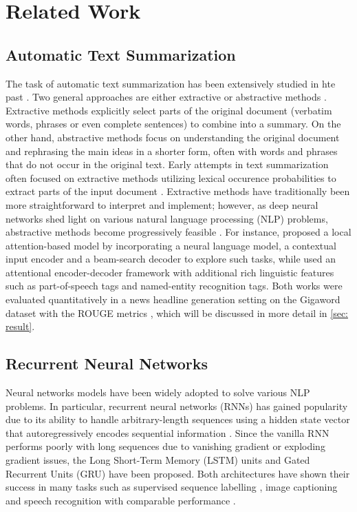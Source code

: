 \section{Related Work}
\label{sec: related_work}

\subsection{Automatic Text Summarization}

The task of automatic text summarization has been extensively studied in hte past \cite{gambhir2017recent}. Two general approaches are either extractive or abstractive methods \cite{gupta2010survey}. Extractive methods explicitly select parts of the original document (verbatim words, phrases or even complete sentences) to combine into a summary. On the other hand, abstractive methods focus on understanding the original document and rephrasing the main ideas in a shorter form, often with words and phrases that do not occur in the original text. Early attempts in text summarization often focused on extractive methods utilizing lexical occurence probabilities to extract parts of the input document \cite{mathis1973improvement}. Extractive methods have traditionally been more straightforward to interpret and implement; however, as deep neural networks shed light on various natural language processing (NLP) problems, abstractive methods become progressively feasible \cite{nallapati2016sequence, nallapati2016abstractive, rush2015neural}. For instance, \cite{rush2015neural} proposed a local attention-based model by incorporating a neural language model, a contextual input encoder and a beam-search decoder to explore such tasks, while \cite{nallapati2016abstractive} used an attentional encoder-decoder framework with additional rich linguistic features such as part-of-speech tags and named-entity recognition tags. Both works were evaluated quantitatively in a news headline generation setting on the Gigaword dataset \cite{graff2003english} with the ROUGE metrics \cite{lin2004rouge}, which will be discussed in more detail in \ref{sec: result}. 

\subsection{Recurrent Neural Networks}
Neural networks models have been widely adopted to solve various NLP problems. In particular, recurrent neural networks (RNNs) has gained popularity due to its ability to handle arbitrary-length sequences using a hidden state vector that autoregressively encodes sequential information \cite{goodfellow2016}. Since the vanilla RNN performs poorly with long sequences due to vanishing gradient or exploding gradient issues, the Long Short-Term Memory (LSTM) units \cite{hochreiter1997long} and Gated Recurrent Units (GRU) \cite{cho2014properties} have been proposed. Both architectures have shown their success in many tasks such as supervised sequence labelling \cite{graves2012supervised}, image captioning \cite{vinyals_2015} and speech recognition \cite{graves2013speech} with comparable performance \cite{yin2017comparative}.

